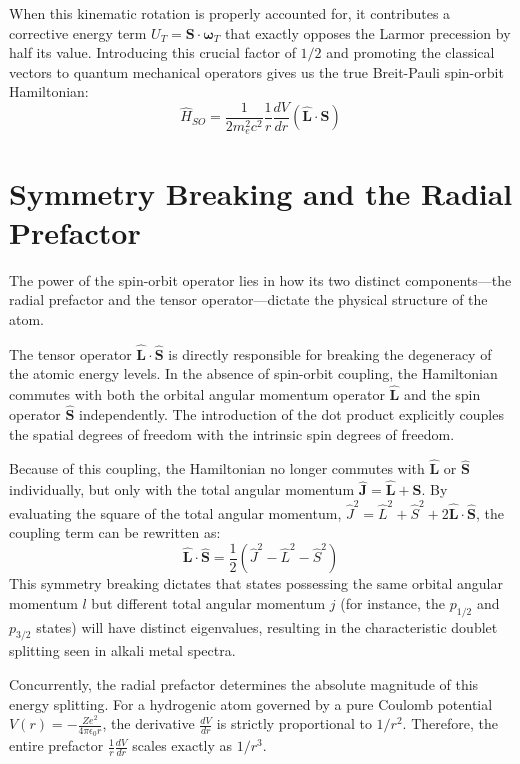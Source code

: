 \documentclass[12pt]{article}
\begin{document}
When this kinematic rotation is properly accounted for, it contributes a corrective energy term $U_T = \mathbf{S} \cdot \boldsymbol{\omega}_T$ that exactly opposes the Larmor precession by half its value. Introducing this crucial factor of $1/2$ and promoting the classical vectors to quantum mechanical operators gives us the true Breit-Pauli spin-orbit Hamiltonian:
\begin{equation}
    \hat{H}_{SO} = \frac{1}{2 m_e^2 c^2} \frac{1}{r} \frac{dV}{dr} (\hat{\mathbf{L}} \cdot \hat{\mathbf{S}})
\end{equation}

\section{Symmetry Breaking and the Radial Prefactor}
The power of the spin-orbit operator lies in how its two distinct components---the radial prefactor and the tensor operator---dictate the physical structure of the atom.

The tensor operator $\hat{\mathbf{L}} \cdot \hat{\mathbf{S}}$ is directly responsible for breaking the degeneracy of the atomic energy levels. In the absence of spin-orbit coupling, the Hamiltonian commutes with both the orbital angular momentum operator $\hat{\mathbf{L}}$ and the spin operator $\hat{\mathbf{S}}$ independently. The introduction of the dot product explicitly couples the spatial degrees of freedom with the intrinsic spin degrees of freedom. 

Because of this coupling, the Hamiltonian no longer commutes with $\hat{\mathbf{L}}$ or $\hat{\mathbf{S}}$ individually, but only with the total angular momentum $\hat{\mathbf{J}} = \hat{\mathbf{L}} + \hat{\mathbf{S}}$. By evaluating the square of the total angular momentum, $\hat{J}^2 = \hat{L}^2 + \hat{S}^2 + 2\hat{\mathbf{L}} \cdot \hat{\mathbf{S}}$, the coupling term can be rewritten as:
\begin{equation}
    \hat{\mathbf{L}} \cdot \hat{\mathbf{S}} = \frac{1}{2} (\hat{J}^2 - \hat{L}^2 - \hat{S}^2)
\end{equation}
This symmetry breaking dictates that states possessing the same orbital angular momentum $l$ but different total angular momentum $j$ (for instance, the $p_{1/2}$ and $p_{3/2}$ states) will have distinct eigenvalues, resulting in the characteristic doublet splitting seen in alkali metal spectra.

Concurrently, the radial prefactor determines the absolute magnitude of this energy splitting. For a hydrogenic atom governed by a pure Coulomb potential $V(r) = -\frac{Z e^2}{4\pi\epsilon_0 r}$, the derivative $\frac{dV}{dr}$ is strictly proportional to $1/r^2$. Therefore, the entire prefactor $\frac{1}{r} \frac{dV}{dr}$ scales exactly as $1/r^3$. 
\end{document}
